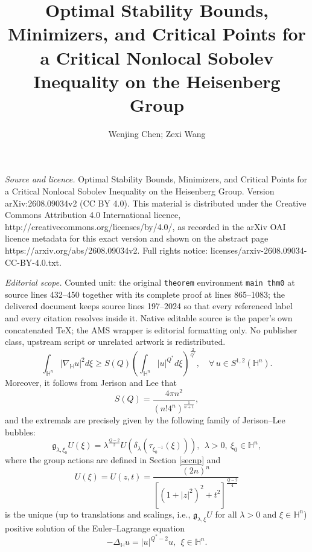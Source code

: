 \documentclass[10pt,a4paper]{amsart}
\begin{document}
\title[Optimal Stability Bounds, Minimizers, and Critical Points fo]{Optimal Stability Bounds, Minimizers, and Critical Points for a Critical Nonlocal Sobolev Inequality on the Heisenberg Group}
\author{Wenjing Chen; Zexi Wang}
\date{}
\maketitle
\noindent\emph{Source and licence.} Optimal Stability Bounds, Minimizers, and Critical Points for a Critical Nonlocal Sobolev Inequality on the Heisenberg Group. Version arXiv:2608.09034v2 (CC BY 4.0). This material is distributed under the Creative Commons Attribution 4.0 International licence, http://creativecommons.org/licenses/by/4.0/, as recorded in the arXiv OAI licence metadata for this exact version and shown on the abstract page https://arxiv.org/abs/2608.09034v2. Full rights notice: licenses/arxiv-2608.09034-CC-BY-4.0.txt.\par\smallskip
\noindent\textit{Editorial scope.} Counted unit: the original \texttt{theorem} environment \texttt{main thm0} at source lines 432--450 together with its complete proof at lines 865--1083; the delivered document keeps source lines 197--2024 so that every referenced label and every citation resolves inside it. Native editable source is the paper's own concatenated TeX; the AMS wrapper is editorial formatting only. No publisher class, upstream script or unrelated artwork is redistributed.
\begin{equation}\label{folland-stein}
 \int_{\mathbb{H}^{n}}|\nabla_{\mathbb{H}}u|^{2}{d}\xi\geq S(Q)\left(\int_{\mathbb{H}^{n}}|u|^{Q^{\ast}}{d}\xi\right)^{\frac{2}{Q^{\ast}}},\quad \forall \, u\in S^{1,2}(\mathbb{H}^{n}).
\end{equation}
Moreover, it follows from Jerison and Lee \cite{JL88} that \[S(Q)=\frac{4\pi n^2}{(n!4^n)^{\frac{1}{n+1}}},\]
{and the extremals are precisely given by the following family of Jerison--Lee bubbles:}
\begin{equation}\label{gU}
 \mathfrak{g}_{\lambda,\xi_0}U(\xi)=\lambda^{\frac{Q-2}{2}}U(\delta_\lambda(\tau_{{\xi_0}^{-1}}(\xi))),
 ~~\lambda>0,~\xi_{0}\in\mathbb{H}^{n},
\end{equation}
{where the group actions are defined in Section \ref{secnp} and} \[U(\xi)=U(z,t)=\frac{(2n)^n}{[(1+|z|^{2})^{2}+t^{2}]^{\frac{Q-2}{4}}}\]
is the unique (up to translations and scalings, i.e., $\mathfrak{g}_{\lambda,\xi}U$ for all $\lambda>0$ and $\xi\in\mathbb{H}^{n}$)
positive solution of the Euler--Lagrange equation
\begin{equation*}
 -\Delta_{\mathbb{H}} u=|u|^{Q^{\ast}-2}u,~~\xi\in\mathbb{H}^{n}.
\end{equation*}
\end{document}
